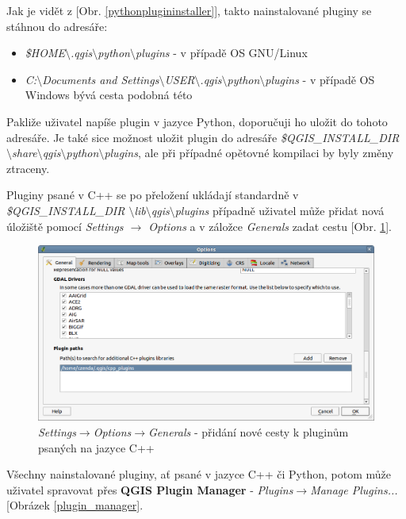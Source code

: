 \noindent Jak je vidět z [Obr. \ref{pythonplugininstaller}], takto nainstalované pluginy se stáhnou do adresáře: 

\begin{itemize}
	\item \textit{\$HOME$\setminus$.qgis$\setminus$python$\setminus$plugins} - v případě OS GNU/Linux
	\item \textit{C:$\setminus$Documents and Settings$\setminus$USER$\setminus$.qgis$\setminus$python$\setminus$plugins} - v případě OS Windows bývá cesta podobná této
\end{itemize}

\noindent Pakliže uživatel napíše plugin v jazyce Python, doporučuji ho uložit do tohoto adresáře. Je také sice možnost uložit plugin do adresáře \textit{\$QGIS\_INSTALL\_DIR $\setminus$share$\setminus$qgis$\setminus$python$\setminus$plugins}, ale při případné opětovné kompilaci by byly změny ztraceny.

\noindent Pluginy psané v C++ se po přeložení ukládají standardně v \textit{\$QGIS\_INSTALL\_DIR $\setminus$lib$\setminus$qgis$\setminus$plugins} případně uživatel může přidat nová úložiště pomocí \textit{Settings $\rightarrow$ Options} a v záložce \textit{Generals} zadat cestu [Obr. \ref{cpprepository}].

\begin{figure}
	\centering
	\includegraphics[scale=0.5]{pictures/qgis_plugin/options_cpp_path}
	\caption{\textit{Settings$\rightarrow$Options$\rightarrow$Generals} - přidání nové cesty k pluginům psaných na jazyce C++}
  	\label{cpprepository}
\end{figure}

\noindent Všechny nainstalované pluginy, ať psané v jazyce C++ či Python, potom může uživatel spravovat přes \textbf{QGIS Plugin Manager} - \textit{Plugins$\rightarrow$Manage Plugins...} [Obrázek \ref{plugin_manager}.

